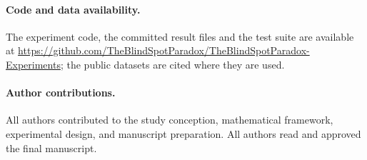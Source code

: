 \documentclass[smallextended]{svjour3}
\newcommand{\RepoURL}{https://github.com/TheBlindSpotParadox/TheBlindSpotParadox-Experiments}
\begin{document}
\paragraph{Code and data availability.} {\raggedright The experiment code, the committed result files and the test suite are available at \url{\RepoURL}; the public datasets are cited where they are used.\par}

\paragraph{Author contributions.} All authors contributed to the study conception, mathematical framework, experimental design, and manuscript preparation. All authors read and approved the final manuscript.

\appendix





\end{document}
